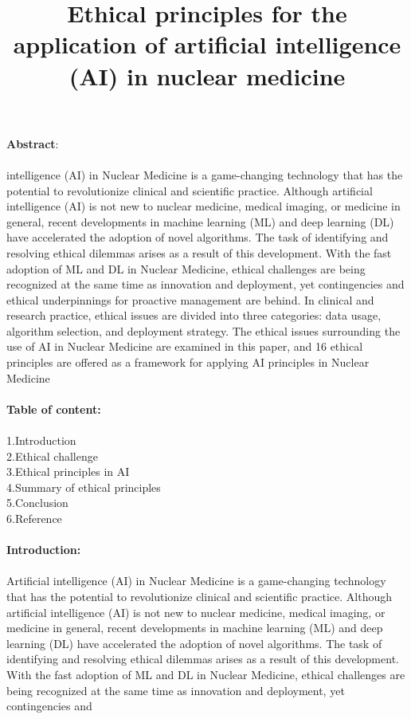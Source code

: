 \documentclass[12pt]{article}
\title{Ethical principles for the application of artificial intelligence (AI) in nuclear medicine}
\date{}
\begin{document}
\maketitle
\noindent
\textbf{\large Abstract}:\\ \\ \Artificial intelligence (AI) in Nuclear Medicine is a game-changing technology that has the potential to
revolutionize clinical and scientific practice. Although artificial intelligence (AI) is not new to nuclear medicine, medical imaging, or medicine in general, recent developments in machine learning (ML) and deep learning (DL)
have accelerated the adoption of novel algorithms. The task of identifying and resolving ethical dilemmas arises
as a result of this development. With the fast adoption of ML and DL in Nuclear Medicine, ethical challenges are
being recognized at the same time as innovation and deployment, yet contingencies and ethical underpinnings
for proactive management are behind. In clinical and research practice, ethical issues are divided into three
categories: data usage, algorithm selection, and deployment strategy. The ethical issues surrounding the use of
AI in Nuclear Medicine are examined in this paper, and 16 ethical principles are offered as a framework for
applying AI principles in Nuclear Medicine
\noindent
\\ \\ \textbf{\large Table of content:}
\\ \\1.Introduction \\ 2.Ethical challenge \\  3.Ethical principles in AI \\  4.Summary of ethical principles \\ 5.Conclusion \\6.Reference \\ \\ \textbf{\large Introduction:} \\ \\ Artificial intelligence (AI) in Nuclear Medicine is a game-changing technology that has the
potential to revolutionize clinical and scientific practice. Although artificial intelligence (AI) is not new to nuclear
medicine, medical imaging, or medicine in general, recent developments in machine learning (ML) and deep
learning (DL) have accelerated the adoption of novel algorithms. The task of identifying and resolving ethical
dilemmas arises as a result of this development. With the fast adoption of ML and DL in Nuclear Medicine, ethical challenges are being recognized at the same time as innovation and deployment, yet contingencies and
\end{document}
